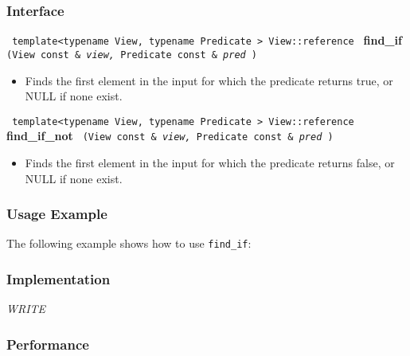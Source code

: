 \subsubsection{Interface} %

\noindent
\texttt{%
template<typename View, typename Predicate >
\newline
View::reference 
}
\newline
\textbf{find\_if}%
\texttt{%
(View const \&
\textit{view,}%
Predicate const \&
\textit{pred}%
)
}

\begin{itemize}
\item
Finds the first element in the input for which the predicate returns true, or NULL if none exist. 
\end{itemize}
 
\noindent
\texttt{%
template<typename View, typename Predicate >
\newline
View::reference 
}
\newline
\textbf{find\_if\_not}%
\texttt{%
(View const \&
\textit{view,}%
Predicate const \&
\textit{pred}%
)
}

\begin{itemize}
\item
Finds the first element in the input for which the predicate returns false, or NULL if none exist. 
\end{itemize}

\subsubsection{Usage Example} %

The following example shows how to use \texttt{find\_if}:

 
\subsubsection{Implementation} %

\textit{WRITE}

\subsubsection{Performance} %

